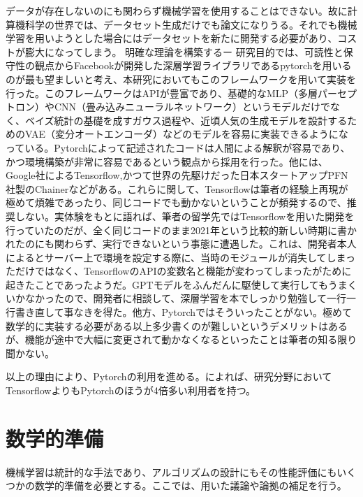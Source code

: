 \documentclass[uplatex]{suribt}
\begin{document}
データが存在しないのにも関わらず機械学習を使用することはできない。故に計算機科学の世界では、データセット生成だけでも論文になりうる。それでも機械学習を用いようとした場合にはデータセットを新たに開発する必要があり、コストが膨大になってしまう。
明確な理論を構築するー
研究目的では、可読性と保守性の観点からFacebookが開発した深層学習ライブラリであるpytorchを用いるのが最も望ましいと考え、本研究においてもこのフレームワークを用いて実装を行った。このフレームワークはAPIが豊富であり、基礎的なMLP（多層パーセプトロン）やCNN（畳み込みニューラルネットワーク）というモデルだけでなく、ベイズ統計の基礎を成すガウス過程や、近頃人気の生成モデルを設計するためのVAE（変分オートエンコーダ）などのモデルを容易に実装できるようになっている。Pytorchによって記述されたコードは人間による解釈が容易であり、かつ環境構築が非常に容易であるという観点から採用を行った。他には、Google社によるTensorflow,かつて世界の先駆けだった日本スタートアップPFN社製のChainerなどがある。これらに関して、Tensorflowは筆者の経験上再現が極めて煩雑であったり、同じコードでも動かないということが頻発するので、推奨しない。実体験をもとに語れば、筆者の留学先ではTensorflowを用いた開発を行っていたのだが、全く同じコードのまま2021年という比較的新しい時期に書かれたのにも関わらず、実行できないという事態に遭遇した。これは、開発者本人によるとサーバー上で環境を設定する際に、当時のモジュールが消失してしまっただけではなく、TensorflowのAPIの変数名と機能が変わってしまったがために起きたことであったようだ。GPTモデルをふんだんに駆使して実行してもうまくいかなかったので、開発者に相談して、深層学習を本でしっかり勉強して一行一行書き直して事なきを得た。他方、Pytorchではそういったことがない。極めて数学的に実装する必要がある以上多少書くのが難しいというデメリットはあるが、機能が途中で大幅に変更されて動かなくなるといったことは筆者の知る限り聞かない。\par
以上の理由により、Pytorchの利用を進める。\cite{torchvstensor}によれば、研究分野においてTensorflowよりもPytorchのほうが4倍多い利用者を持つ。
\chapter{数学的準備}
機械学習は統計的な手法であり、アルゴリズムの設計にもその性能評価にもいくつかの数学的準備を必要とする。ここでは、用いた議論や論拠の補足を行う。
\end{document}
